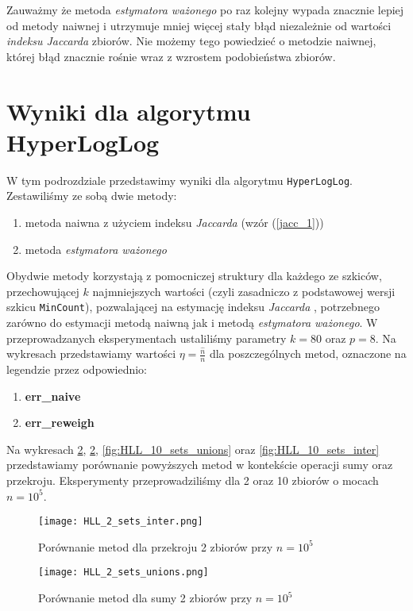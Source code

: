 Zauważmy że metoda \textit{estymatora ważonego} po raz kolejny wypada znacznie lepiej od metody naiwnej i utrzymuje mniej więcej stały błąd niezależnie od wartości \textit{indeksu Jaccarda} zbiorów. Nie możemy tego powiedzieć o metodzie naiwnej, której błąd znacznie rośnie wraz z wzrostem podobieństwa zbiorów.

\newpage
\section{Wyniki dla algorytmu HyperLogLog}
W tym podrozdziale przedstawimy wyniki dla algorytmu \texttt{HyperLogLog}. Zestawiliśmy ze sobą dwie metody:
\begin{enumerate}
	\item metoda naiwna z użyciem indeksu \textit{Jaccarda} (wzór (\ref{jacc_1}))
	\item metoda \textit{estymatora ważonego}
\end{enumerate}
Obydwie metody korzystają z pomocniczej struktury dla każdego ze szkiców, przechowującej $k$ najmniejszych wartości (czyli zasadniczo z podstawowej wersji szkicu \texttt{MinCount}), pozwalającej na estymację indeksu \textit{Jaccarda} \cite{adroll}, potrzebnego zarówno do estymacji metodą naiwną jak i metodą \textit{estymatora ważonego}. W przeprowadzanych eksperymentach ustaliliśmy parametry $k = 80$ oraz $p = 8$.
Na wykresach przedstawiamy wartości $\eta = \frac{\hat{n}}{n}$ dla poszczególnych metod, oznaczone na legendzie przez odpowiednio:
\begin{enumerate}
	\item \textbf{err\_naive}
	\item \textbf{err\_reweigh}
\end{enumerate}

Na wykresach \ref{fig:HLL_2_sets_unions}, \ref{fig:HLL_2_sets_unions}, \ref{fig:HLL_10_sets_unions} oraz \ref{fig:HLL_10_sets_inter} przedstawiamy porównanie powyższych metod w kontekście operacji sumy oraz przekroju. Eksperymenty przeprowadziliśmy dla 2 oraz 10 zbiorów o mocach $n=10^5$.

\begin{figure}[h!]
	\texttt{[image: HLL\_2\_sets\_inter.png]}
	\centering
	\caption{Porównanie metod dla przekroju 2 zbiorów przy $n=10^5$}
	\label{fig:HLL_2_sets_inter}
\end{figure}

\begin{figure}[h!]
	\texttt{[image: HLL\_2\_sets\_unions.png]}
	\centering
	\caption{Porównanie metod dla sumy 2 zbiorów przy $n=10^5$}
	\label{fig:HLL_2_sets_unions}
\end{figure}

